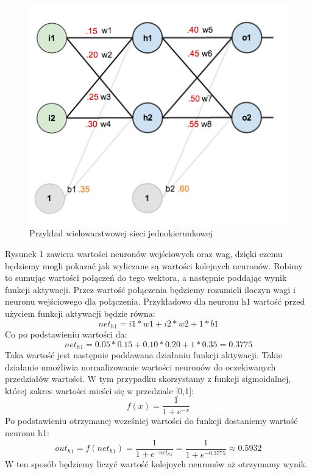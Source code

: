 \begin{figure}[!ht]
    \includegraphics[width=\linewidth]{images/feed-forward-diagram.png}
    \caption{Przykład wielowarstwowej sieci jednokierunkowej}
\end{figure}

Rysunek 1 zawiera wartości neuronów wejściowych oraz wag, dzięki czemu będziemy mogli pokazać jak wyliczane są wartości kolejnych neuronów.
Robimy to sumując wartości połączeń do tego wektora, a następnie poddając wynik funkcji aktywacji.
Przez wartość połączenia będziemy rozumieli iloczyn wagi i neuronu wejściowego dla połączenia.
Przykładowo dla neuronu h1 wartość przed użyciem funkcji aktywacji będzie równa:
\[
  net_{h1}  = i1*w1+i2*w2+1*b1
\]
Co po podstawieniu wartości da:
\[
  net_{h1} = 0.05*0.15+0.10*0.20+1*0.35=0.3775
\]
Taka wartość jest następnie poddawana działaniu funkcji aktywacji. 
Takie działanie umożliwia normalizowanie wartości neuronów do oczekiwanych przedziałów wartości.
W tym przypadku skorzystamy z funkcji sigmoidalnej, której zakres wartości mieści się w przedziale [0,1]:
\[
    f(x) =  \frac{\mathrm{1} }{\mathrm{1} + e^{-x} } 
\]
Po podstawieniu otrzymanej wcześniej wartości do funkcji dostaniemy wartość neuronu h1:
\[
    out_{h1} 
    = f(net_{h1}) 
    =  \frac{\mathrm{1} }{\mathrm{1} + e^{-net_{h1}} } 
    =  \frac{\mathrm{1} }{\mathrm{1} + e^{-0.3775} } \approx 0.5932
\]
W ten sposób będziemy liczyć wartość kolejnych neuronów aż otrzymamy wynik.


